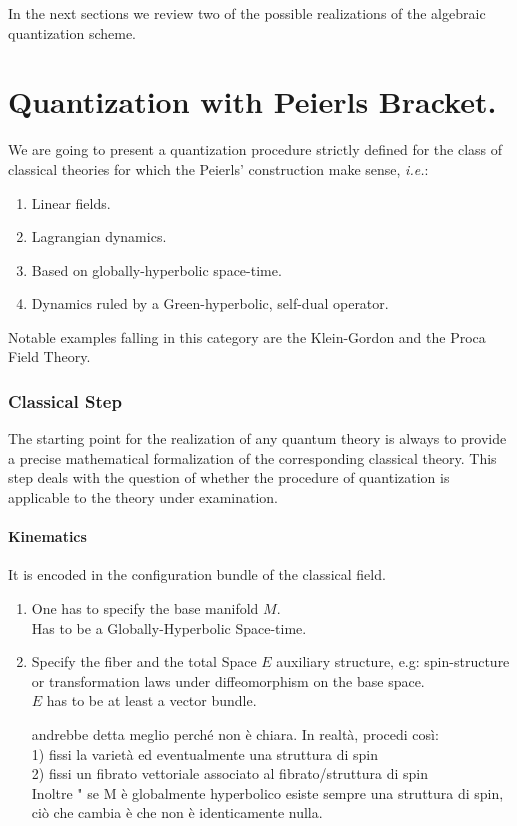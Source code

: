\documentclass[Main]{subfiles}
\begin{document}
In the next sections we review two of the possible realizations of the algebraic quantization scheme.

\section{Quantization with Peierls Bracket.}
	We are going to present a quantization procedure strictly defined for the class of classical theories for which the Peierls' construction make sense, \textit{i.e.}:
	\begin{enumerate}
		\item Linear fields.
		\item Lagrangian dynamics.
		\item Based on globally-hyperbolic space-time.
		\item Dynamics ruled by a Green-hyperbolic, self-dual operator.	
	\end{enumerate}
	Notable examples falling in this category are the
	Klein-Gordon and the  Proca Field Theory\cite{Benini}.

	\subsubsection{Classical Step}%
	The starting point for the realization of any quantum theory is always to provide a precise mathematical formalization of the corresponding classical theory.
	This step deals with the question of whether the procedure of quantization is applicable to the theory under examination.
	
		\paragraph{Kinematics}
		It is encoded in the configuration bundle of the classical field.
   					\begin{enumerate}
   						\item One has to specify the base manifold $M$. \\Has to be a Globally-Hyperbolic Space-time.
   						\item\label{Step:AuxiliaryStructure} Specify the fiber and the total Space $E$ auxiliary structure, e.g: spin-structure or transformation laws under diffeomorphism on the base space.\\$E$ has to be at least a vector bundle.
   						\begin{Warning}
   							andrebbe detta meglio perché non è chiara. In realtà, procedi così:\\
   							1) fissi la varietà ed eventualmente una struttura di spin \\
   							2) fissi un fibrato vettoriale associato al fibrato/struttura di spin\\
   							
   							Inoltre " se M è globalmente hyperbolico esiste sempre una struttura di spin, ciò che  cambia è che non è identicamente nulla.
   							
   						\end{Warning}
   					\end{enumerate}
   		
\end{document}
